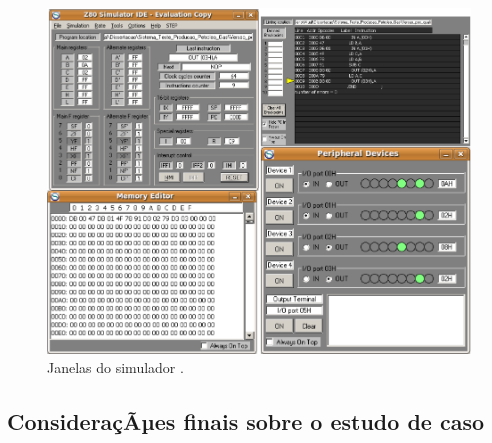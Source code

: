 \documentclass[11pt]{article} %
\begin{document}



\begin{figure}[h]
\centering
\includegraphics[width=1.0\textwidth]{images/Simulator_Full.png}
\caption{Janelas do simulador \cite{Simulator_z80}.}
\label{fig:simulacao}
\end{figure}




\subsection{ConsideraçÃµes finais sobre o estudo de caso}
\end{document}
